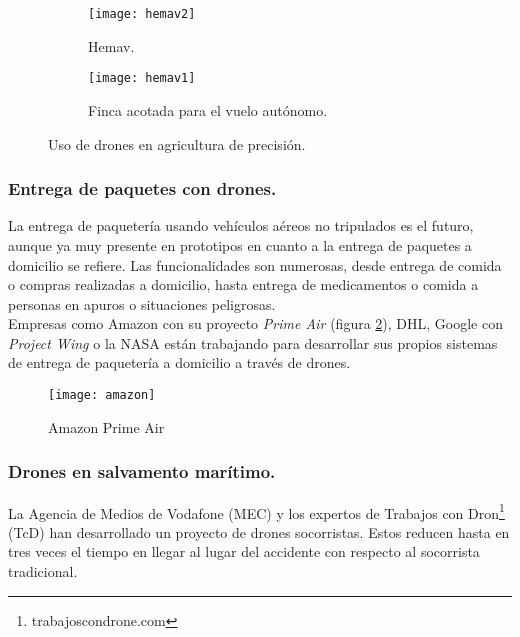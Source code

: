 \begin{figure}[h!]
\centering
  \begin{subfigure}[]{60mm}
    \texttt{[image: hemav2]}
    \caption{Hemav.} 
  \end{subfigure}
  \hspace{5pt}
  \begin{subfigure}[]{60mm}
    \texttt{[image: hemav1]}
    \caption{Finca acotada para el vuelo autónomo.}
  \end{subfigure}
    \caption{Uso de drones en agricultura de precisión.}\label{fig:quadrotor_movements}
  \label{fig:hemav}
\end{figure}


\subsubsection{Entrega de paquetes con drones.}

La entrega de paquetería usando vehículos aéreos no tripulados es el futuro, aunque ya muy presente en prototipos en cuanto a la entrega de paquetes a domicilio se refiere. Las funcionalidades son numerosas, desde entrega de comida o compras realizadas a domicilio, hasta entrega de medicamentos o comida a personas en apuros o situaciones peligrosas.\\

Empresas como Amazon con su proyecto \emph{Prime Air} (figura \ref{fig:amazon}), DHL, Google con \emph{Project Wing} o la NASA están trabajando para desarrollar sus propios sistemas de entrega de paquetería a domicilio a través de drones.\\

\begin{figure}[h!]
\centering
\texttt{[image: amazon]}
\caption{Amazon Prime Air}
\label{fig:amazon}
\end{figure}

\subsubsection{Drones en salvamento marítimo.}

La Agencia de Medios de Vodafone (MEC) y los expertos de Trabajos con Dron\footnote{trabajoscondrone.com} (TcD) han desarrollado un proyecto de drones socorristas. Estos reducen hasta en tres veces el tiempo en llegar al lugar del accidente con respecto al socorrista tradicional.\\

